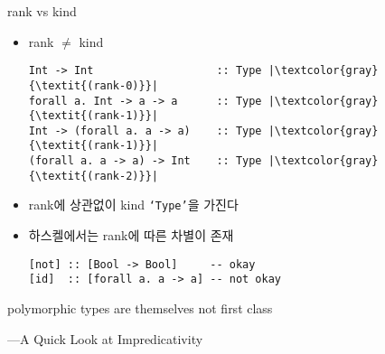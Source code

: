 \documentclass{beamer}
\begin{document}
\begin{frame}[fragile] {rank vs kind}
  \begin{itemize}
    \item rank \(\neq\) kind
      \pause
\begin{verbatim}
Int -> Int                   :: Type |\textcolor{gray}{\textit{(rank-0)}}|
forall a. Int -> a -> a      :: Type |\textcolor{gray}{\textit{(rank-1)}}|
Int -> (forall a. a -> a)    :: Type |\textcolor{gray}{\textit{(rank-1)}}|
(forall a. a -> a) -> Int    :: Type |\textcolor{gray}{\textit{(rank-2)}}|
\end{verbatim}
    \pause
  \item rank에 상관없이 kind \texttt{\enquote*{Type}}을 가진다
  \pause
  \item 하스켈에서는 rank에 따른 차별이 존재
\begin{verbatim}
[not] :: [Bool -> Bool]     -- okay
[id]  :: [forall a. a -> a] -- not okay
\end{verbatim}
  \end{itemize}
  \pause
  \begin{displayquote}
    polymorphic types are themselves not first class
    \par\raggedleft---A Quick Look at Impredicativity
  \end{displayquote}
\end{frame}
\end{document}
